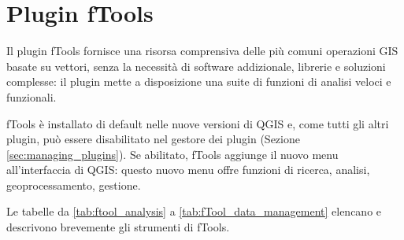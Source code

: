 
\section{Plugin fTools}\label{sec:ftools}


Il plugin fTools fornisce una risorsa comprensiva delle più 
comuni operazioni GIS basate su vettori, senza la necessità di software addizionale, 
librerie e soluzioni complesse: il plugin mette a disposizione una suite di 
funzioni di analisi veloci e funzionali.

fTools è installato di default nelle nuove versioni di QGIS e, come tutti gli altri plugin, 
può essere disabilitato nel gestore dei plugin (Sezione \ref{sec:managing_plugins}).
Se abilitato, fTools aggiunge il nuovo menu  all'interfaccia 
di QGIS: questo nuovo menu offre funzioni di ricerca, analisi, geoprocessamento, gestione.

\label{ftool_functions}

Le tabelle da \ref{tab:ftool_analysis} a \ref{tab:fTool_data_management} 
elencano e descrivono brevemente gli strumenti di fTools. 

